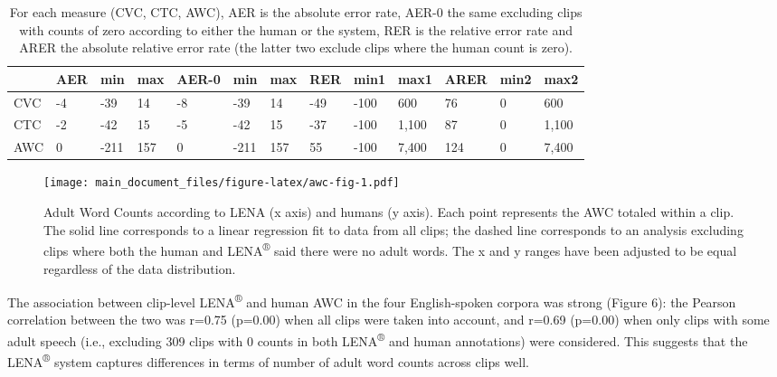\documentclass[english,table,man,floatsintext]{apa6}
\begin{document}
\begin{table}[tbp]

\begin{center}
\begin{threeparttable}

\caption{\label{tab:tabrers}For each measure (CVC, CTC, AWC), AER is the absolute error rate, AER-0 the same excluding clips with counts of zero according to either the human or the system, RER is the relative error rate and ARER the absolute relative error rate (the latter two exclude clips where the human count is zero). }

\begin{tabular}{lllllllllllll}
\toprule
 & \multicolumn{1}{c}{AER} & \multicolumn{1}{c}{min} & \multicolumn{1}{c}{max} & \multicolumn{1}{c}{AER-0} & \multicolumn{1}{c}{min} & \multicolumn{1}{c}{max} & \multicolumn{1}{c}{RER} & \multicolumn{1}{c}{min1} & \multicolumn{1}{c}{max1} & \multicolumn{1}{c}{ARER} & \multicolumn{1}{c}{min2} & \multicolumn{1}{c}{max2}\\
\midrule
CVC & -4 & -39 & 14 & -8 & -39 & 14 & -49 & -100 & 600 & 76 & 0 & 600\\
CTC & -2 & -42 & 15 & -5 & -42 & 15 & -37 & -100 & 1,100 & 87 & 0 & 1,100\\
AWC & 0 & -211 & 157 & 0 & -211 & 157 & 55 & -100 & 7,400 & 124 & 0 & 7,400\\
\bottomrule
\end{tabular}

\end{threeparttable}
\end{center}

\end{table}

\begin{figure}
\centering
\texttt{[image: main\_document\_files/figure-latex/awc-fig-1.pdf]}
\caption{\label{fig:awc-fig}Adult Word Counts according to LENA (x axis) and humans (y axis). Each point represents the AWC totaled within a clip. The solid line corresponds to a linear regression fit to data from all clips; the dashed line corresponds to an analysis excluding clips where both the human and LENA\textsuperscript{®} said there were no adult words. The x and y ranges have been adjusted to be equal regardless of the data distribution.}
\end{figure}

The association between clip-level LENA\textsuperscript{®} and human AWC in the four English-spoken corpora was strong (Figure 6): the Pearson correlation between the two was r=0.75 (p=0.00) when all clips were taken into account, and r=0.69 (p=0.00) when only clips with some adult speech (i.e., excluding 309 clips with 0 counts in both LENA\textsuperscript{®} and human annotations) were considered. This suggests that the LENA\textsuperscript{®} system captures differences in terms of number of adult word counts across clips well.
\end{document}
